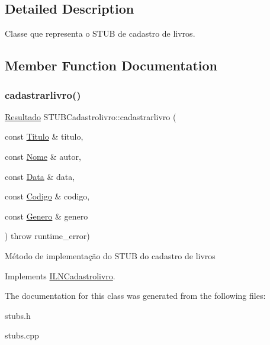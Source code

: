 \subsection{Detailed Description}
Classe que representa o S\+T\+UB de cadastro de livros. 

\subsection{Member Function Documentation}
\mbox{\label{classSTUBCadastrolivro_ae0ef9f6f0a4ea7c397285b4a609bf07b}} 
\subsubsection{\texorpdfstring{cadastrarlivro()}{cadastrarlivro()}}
{\footnotesize\ttfamily \hyperlink{classResultado}{Resultado} S\+T\+U\+B\+Cadastrolivro\+::cadastrarlivro (\begin{DoxyParamCaption}\item[{const \hyperlink{classTitulo}{Titulo} \&}]{titulo,  }\item[{const \hyperlink{classNome}{Nome} \&}]{autor,  }\item[{const \hyperlink{classData}{Data} \&}]{data,  }\item[{const \hyperlink{classCodigo}{Codigo} \&}]{codigo,  }\item[{const \hyperlink{classGenero}{Genero} \&}]{genero }\end{DoxyParamCaption}) throw  runtime\+\_\+error) \hspace{0.3cm}{\ttfamily [virtual]}}

Método de implementação do S\+T\+UB do cadastro de livros 

Implements \hyperlink{classILNCadastrolivro}{I\+L\+N\+Cadastrolivro}.



The documentation for this class was generated from the following files\+:\begin{DoxyCompactItemize}
\item 
stubs.\+h\item 
stubs.\+cpp\end{DoxyCompactItemize}
